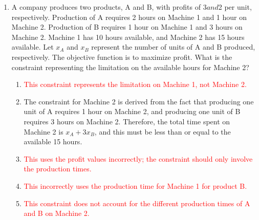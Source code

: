 \documentclass{article}%
\newcommand{\incorrect}[1]{\textcolor{red}{#1}}
\begin{document}
\begin{enumerate}
\begin{enumerate}
\item \incorrect{A positive shadow price indicates an increase in profit, not a decrease.}%
\item \incorrect{A non-zero shadow price indicates that the resource is a limiting factor.}%
\item \incorrect{The shadow price is always relevant; it shows the marginal value of the resource.}%
\item \incorrect{The shadow price provides sufficient information to interpret the impact of additional Machine 1 time.}%
\end{enumerate}%
\vspace{1em}%
\item A company produces two products, A and B, with profits of $3 and $2 per unit, respectively. Production of A requires 2 hours on Machine 1 and 1 hour on Machine 2. Production of B requires 1 hour on Machine 1 and 3 hours on Machine 2. Machine 1 has 10 hours available, and Machine 2 has 15 hours available. Let $x_A$ and $x_B$ represent the number of units of A and B produced, respectively.  The objective function is to maximize profit. What is the constraint representing the limitation on the available hours for Machine 2?%
\begin{enumerate}%
\item \incorrect{This constraint represents the limitation on Machine 1, not Machine 2.}%
\item The constraint for Machine 2 is derived from the fact that producing one unit of A requires 1 hour on Machine 2, and producing one unit of B requires 3 hours on Machine 2.  Therefore, the total time spent on Machine 2 is $x_A + 3x_B$, and this must be less than or equal to the available 15 hours.%
\item \incorrect{This uses the profit values incorrectly; the constraint should only involve the production times.}%
\item \incorrect{This incorrectly uses the production time for Machine 1 for product B.}%
\item \incorrect{This constraint does not account for the different production times of A and B on Machine 2.}%
\end{enumerate}%
\vspace{1em}%
\end{enumerate}

%
\end{document}
